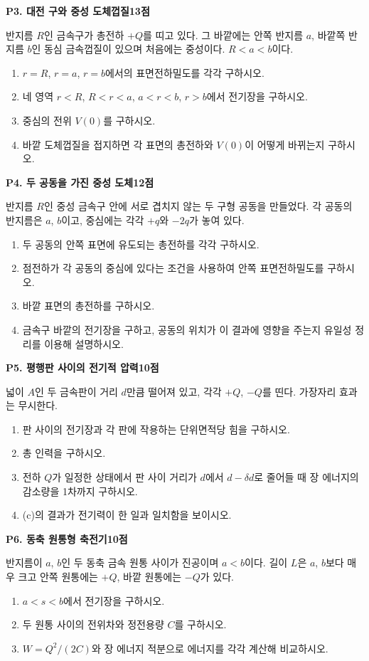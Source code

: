 \documentclass[11pt,a4paper]{article}
\newcommand{\problem}[3]{%
  \par\vspace{3.5mm}
  {\large\bfseries\color{navy}#1\hfill{\normalsize\color{blue}#2점}}\par
  \smallskip #3\par
}
\begin{document}
\problem{P3. 대전 구와 중성 도체껍질}{13}{%
반지름 $R$인 금속구가 총전하 $+Q$를 띠고 있다. 그 바깥에는 안쪽 반지름 $a$, 바깥쪽 반지름 $b$인 동심 금속껍질이 있으며 처음에는 중성이다. $R<a<b$이다.
\begin{enumerate}[label=(\alph*)]
  \item $r=R$, $r=a$, $r=b$에서의 표면전하밀도를 각각 구하시오.
  \item 네 영역 $r<R$, $R<r<a$, $a<r<b$, $r>b$에서 전기장을 구하시오.
  \item 중심의 전위 $V(0)$를 구하시오.
  \item 바깥 도체껍질을 접지하면 각 표면의 총전하와 $V(0)$이 어떻게 바뀌는지 구하시오.
\end{enumerate}
}

\problem{P4. 두 공동을 가진 중성 도체}{12}{%
반지름 $R$인 중성 금속구 안에 서로 겹치지 않는 두 구형 공동을 만들었다. 각 공동의 반지름은 $a$, $b$이고, 중심에는 각각 $+q$와 $-2q$가 놓여 있다.
\begin{enumerate}[label=(\alph*)]
  \item 두 공동의 안쪽 표면에 유도되는 총전하를 각각 구하시오.
  \item 점전하가 각 공동의 중심에 있다는 조건을 사용하여 안쪽 표면전하밀도를 구하시오.
  \item 바깥 표면의 총전하를 구하시오.
  \item 금속구 바깥의 전기장을 구하고, 공동의 위치가 이 결과에 영향을 주는지 유일성 정리를 이용해 설명하시오.
\end{enumerate}
}

\problem{P5. 평행판 사이의 전기적 압력}{10}{%
넓이 $A$인 두 금속판이 거리 $d$만큼 떨어져 있고, 각각 $+Q$, $-Q$를 띤다. 가장자리 효과는 무시한다.
\begin{enumerate}[label=(\alph*)]
  \item 판 사이의 전기장과 각 판에 작용하는 단위면적당 힘을 구하시오.
  \item 총 인력을 구하시오.
  \item 전하 $Q$가 일정한 상태에서 판 사이 거리가 $d$에서 $d-\delta d$로 줄어들 때 장 에너지의 감소량을 1차까지 구하시오.
  \item (c)의 결과가 전기력이 한 일과 일치함을 보이시오.
\end{enumerate}
}

\problem{P6. 동축 원통형 축전기}{10}{%
반지름이 $a$, $b$인 두 동축 금속 원통 사이가 진공이며 $a<b$이다. 길이 $L$은 $a$, $b$보다 매우 크고 안쪽 원통에는 $+Q$, 바깥 원통에는 $-Q$가 있다.
\begin{enumerate}[label=(\alph*)]
  \item $a<s<b$에서 전기장을 구하시오.
  \item 두 원통 사이의 전위차와 정전용량 $C$를 구하시오.
  \item $W=Q^2/(2C)$와 장 에너지 적분으로 에너지를 각각 계산해 비교하시오.
\end{enumerate}
}
\end{document}
